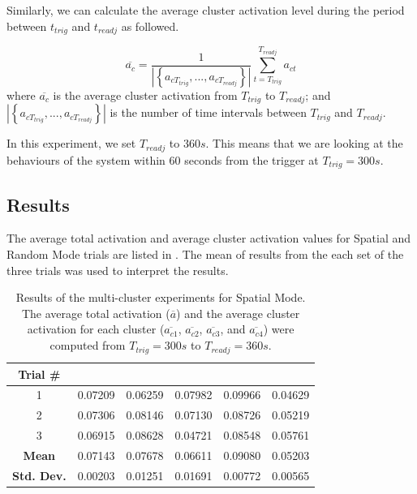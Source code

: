 Similarly, we can calculate the average cluster activation level during the period between $t_{trig}$ and $t_{readj}$ as followed.

\begin{equation}\label{eqn:average_cluster_activation}
\overline{a_c} = \frac{1}{| \left\{ a_{cT_{trig}}, ... , a_{cT_{readj}} \right\}|} \sum_{t=T_{trig}}^{T_{readj}} a_{ct}
\end{equation}
where $\overline{a_c}$ is the average cluster activation from $T_{trig}$ to $T_{readj}$; and $| \left\{ a_{cT_{trig}}, ..., a_{cT_{readj}} \right\}|$ is the number of time intervals between $T_{trig}$ and $T_{readj}$.

In this experiment, we set  $T_{readj}$ to $360s$. This means that we are looking at the behaviours of the system within 60 seconds from the trigger at $T_{trig} = 300s$.

\subsection{Results}

The average total activation and average cluster activation values for Spatial and Random Mode trials are listed in . The mean of results from the each set of the three trials was used to interpret the results. 

\begin{table}[!htb]
	\caption[Results of the multi-cluster experiment for Spatial Mode]{Results of the multi-cluster experiments for Spatial Mode. The average total activation ($\overline{a}$) and the average cluster activation for each cluster ($\overline{a_{c1}}$, $\overline{a_{c2}}$, $\overline{a_{c3}}$, and $\overline{a_{c4}}$) were computed from $T_{trig} = 300s$ to  $T_{readj} = 360s $.}
	\begin{center}
		\begin{tabular}{ | c | c | c | c | c | c |} 
			\hline
			\textbf{Trial \#} & \boldmath{$\overline{a}$}  & \boldmath{$\overline{a_{c1}}$}  & \boldmath{$\overline{a_{c2}}$} & \boldmath{$\overline{a_{c3}}$} & \boldmath{$\overline{a_{c4}}$} \\ 
			\hline
			\hline
			1 & 0.07209 & 0.06259 & 0.07982 & 0.09966 & 0.04629 \\
			\hline
			2 & 0.07306 & 0.08146 & 0.07130 & 0.08726 & 0.05219 \\
			\hline
			3 & 0.06915 & 0.08628 & 0.04721 & 0.08548 & 0.05761 \\
			\hlineB{3}	
			\textbf{Mean} & 0.07143	 & 0.07678 & 0.06611 & 0.09080 & 0.05203 \\
			\hline
			\textbf{Std. Dev.} & 0.00203 & 0.01251 & 0.01691 & 0.00772 & 0.00565 \\
			\hline			
		\end{tabular}
	\end{center}
	\label{table:multi-cluster-results-spatial}
\end{table}

